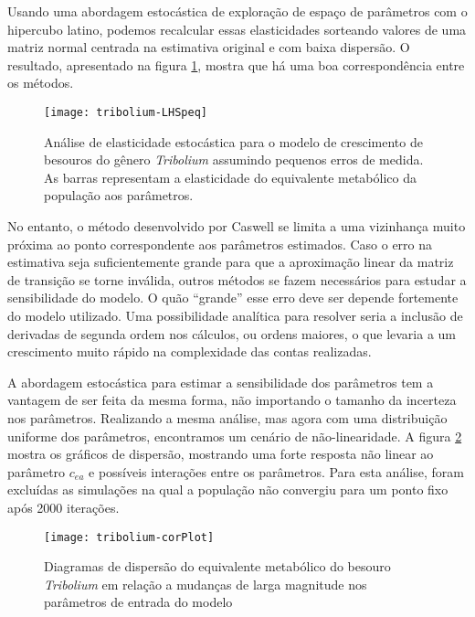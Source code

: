\documentclass[12pt,a4paper]{article}
\begin{document}
Usando uma abordagem estoc\'astica de explora\c c\~ao de espa\c co
de par\^ametros com o hipercubo latino, podemos recalcular essas
elasticidades sorteando valores de uma matriz normal centrada na
estimativa original e com baixa dispers\~ao. O resultado, apresentado
na figura \ref{LHSpeq}, mostra que h\'a uma boa correspond\^encia entre os
m\'etodos.

\begin{figure}
\texttt{[image: tribolium-LHSpeq]}
	\caption{An\'alise de elasticidade estoc\'astica para o modelo de
	crescimento de besouros do g\^enero {\em Tribolium} assumindo
	pequenos erros de medida. As barras
	representam a elasticidade do equivalente metab\'olico da 
	popula\c c\~ao aos par\^ametros.}
	\label{LHSpeq}
\end{figure}

No entanto, o m\'etodo desenvolvido por Caswell se limita a uma 
vizinhan\c ca muito pr\'oxima ao ponto correspondente aos 
par\^ametros estimados. Caso o erro na estimativa seja suficientemente
grande para que a aproxima\c c\~ao linear da matriz de transi\c c\~ao
se torne inv\'alida, outros m\'etodos se fazem necess\'arios para
estudar a sensibilidade do modelo. 
O qu\~ao ``grande'' esse erro
deve ser depende fortemente do modelo utilizado.
Uma possibilidade anal\'itica para
resolver seria a inclus\~ao de derivadas de segunda ordem nos c\'alculos,
ou ordens maiores, o que levaria a um crescimento muito r\'apido
na complexidade das contas realizadas.

A abordagem estoc\'astica para estimar a sensibilidade dos par\^ametros
tem a vantagem de ser feita da mesma forma, n\~ao importando o tamanho
da incerteza nos par\^ametros. Realizando a mesma an\'alise, mas agora com
uma distribui\c c\~ao uniforme dos par\^ametros, 
encontramos um cen\'ario de n\~ao-linearidade. A figura \ref{corPlot}
mostra os gr\'aficos de dispers\~ao, mostrando uma forte resposta
n\~ao linear ao par\^ametro $c_{ea}$ e poss\'iveis intera\c c\~oes 
entre os par\^ametros. Para esta an\'alise, foram exclu\'idas as
simula\c c\~oes na qual a popula\c c\~ao n\~ao convergiu para um
ponto fixo ap\'os 2000 itera\c c\~oes.

\begin{figure}
\texttt{[image: tribolium-corPlot]}
	\caption{Diagramas de dispers\~ao do equivalente metab\'olico
	do besouro {\em Tribolium} em rela\c c\~ao a mudan\c cas
	de larga magnitude nos par\^ametros de entrada do modelo}
	\label{corPlot}
\end{figure}
\end{document}
